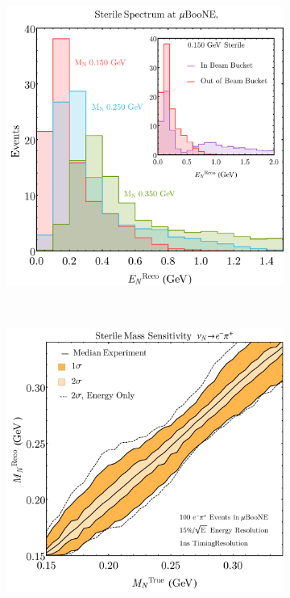 \documentclass[11pt, a4paper]{article}
\begin{document}
\begin{figure}[t]
\center
\begin{subfigure}[t]{0.485\textwidth}
\includegraphics[width=\textwidth]{figures/sterilecomparason.pdf}
\end{subfigure}%
~
\begin{subfigure}[t]{0.515\textwidth}
\includegraphics[width=\textwidth]{figures/icarus_mass_sensitivity.pdf}
\end{subfigure}


\end{figure}
\end{document}
